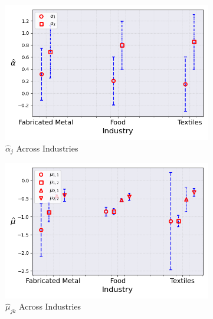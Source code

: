 \documentclass{article}
\begin{document}
\begin{figure}[ht!]
    \centering 
    \caption{AR(1) Mixture Model Across Industries ($M_0 = 2$)}
    \begin{subfigure}[t]{0.32\textwidth}
        \centering
        \includegraphics[width=\textwidth]{figure/ar1_mixture_alpha_across_industries_m2.png}
        \caption{$\hat\alpha_j$ Across Industries}
    \end{subfigure}
    \begin{subfigure}[t]{0.32\textwidth}
        \centering
        \includegraphics[width=\textwidth]{figure/ar1_mixture_mu_across_industries_m2.png}
        \caption{$\hat\mu_{jk}$ Across Industries}
    \end{subfigure}
    \begin{subfigure}[t]{0.32\textwidth}
        \centering

\end{subfigure}
\end{figure}
\end{document}
